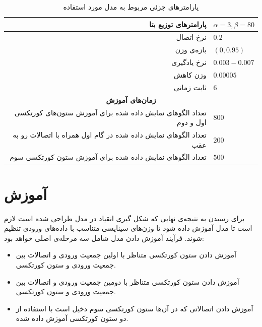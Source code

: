 \documentclass[12pt]{report}
\begin{document}
\begin{table}[p]
{\begin{tabular}{|rrrl|}
		\multicolumn{3}{|r|}{پارامتر‌های توزیع بتا}                                               & $\alpha=3, \beta=80$           \\ \hline
		\multicolumn{3}{|r|}{نرخ اتصال}                                                           & $0.2$                 \\ \hline
		\multicolumn{3}{|r|}{بازه‌ی وزن}                                                          & $(0, 0.95)$           \\ \hline
		\multicolumn{3}{|r|}{نرخ یادگیری}                                                         & $0.003 - 0.007$       \\ \hline
		\multicolumn{3}{|r|}{وزن کاهش}                                                            & $0.00005$             \\ \hline
		\multicolumn{3}{|r|}{ثابت زمانی}                                                          & $6$                   \\ \hline
		\multicolumn{4}{|c|}{\textbf{زمان‌های آموزش}}                                                                   \\ \hline
		\multicolumn{3}{|r|}{تعداد الگو‌های نمایش داده شده برای آموزش ستون‌های کورتکسی اول و دوم} & $800$                \\ \hline
		\multicolumn{3}{|r|}{تعداد الگو‌های نمایش داده شده در گام اول همراه با اتصالات رو به عقب} & $200$                \\ \hline
		\multicolumn{3}{|r|}{تعداد الگو‌های نمایش داده شده برای آموزش ستون کورتکسی سوم}           & $500$                 \\ \hline
\end{tabular}}
\caption{\label{table:parameters-details}پارامتر‌های جزئی مربوط به مدل مورد استفاده}
\end{table}





	
	\section{آموزش}
	برای رسیدن به نتیجه‌ی نهایی که شکل گیری انقیاد در مدل طراحی شده است لازم است تا مدل آموزش داده شود تا وزن‌های سیناپسی متناسب با داده‌های ورودی تنظیم شوند. 
	فرآیند آموزش دادن مدل شامل سه مرحله‌ی اصلی خواهد بود:
	
	\begin{itemize}
		\item آموزش دادن ستون کورتکسی متناظر با اولین جمعیت ورودی و اتصالات بین جمعیت ورودی و ستون کورتکسی.
		\item آموزش دادن ستون کورتکسی متناظر با دومین جمعیت ورودی و اتصالات بین جمعیت ورودی و ستون کورتکسی.
		\item آموزش دادن اتصالاتی که در آن‌ها ستون کورتکسی سوم دخیل است با استفاده از دو ستون کورتکسی آموزش داده شده.
	\end{itemize}
\end{document}
